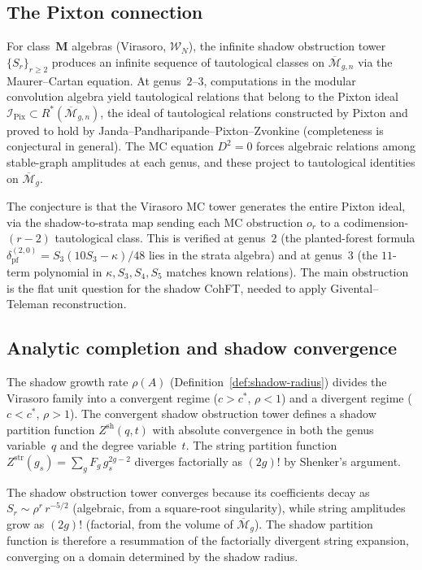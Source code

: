 \documentclass[11pt]{article}
\theoremstyle{plain}
\theoremstyle{definition}
\theoremstyle{remark}
\newcommand{\Mbar}{\overline{\mathcal{M}}}
\newcommand{\cW}{\mathcal{W}}
\begin{document}
\subsection*{The Pixton connection}

For class~$\mathbf{M}$ algebras (Virasoro, $\cW_N$), the
infinite shadow obstruction tower $\{S_r\}_{r \geq 2}$ produces an infinite
sequence of tautological classes on $\Mbar_{g,n}$ via the
Maurer--Cartan equation. At genus~$2$--$3$, computations in
the modular convolution algebra yield tautological relations
that belong to the Pixton ideal $\mathcal{I}_{\mathrm{Pix}}
\subset R^*(\Mbar_{g,n})$, the ideal of tautological
relations constructed by Pixton and proved to hold
by Janda--Pandharipande--Pixton--Zvonkine \cite{JPPZ}
(completeness is conjectural in general).
The MC equation $D^2 = 0$ forces algebraic relations
among stable-graph amplitudes at each genus, and these
project to tautological identities on $\Mbar_g$.

The conjecture is that the Virasoro MC tower generates the
entire Pixton ideal, via the shadow-to-strata map sending
each MC obstruction $o_r$ to a codimension-$(r-2)$
tautological class. This is verified at genus~$2$ (the
planted-forest formula
$\delta_{\mathrm{pf}}^{(2,0)} = S_3(10S_3 - \kappa)/48$
lies in the strata algebra) and at genus~$3$ (the
$11$-term polynomial in $\kappa, S_3, S_4, S_5$ matches
known relations). The main obstruction is the flat unit
question for the shadow CohFT, needed to apply
Givental--Teleman reconstruction.


\subsection*{Analytic completion and shadow convergence}

The shadow growth rate $\rho(A)$
(Definition~\ref{def:shadow-radius}) divides the Virasoro
family into a convergent regime ($c > c^*$, $\rho < 1$) and
a divergent regime ($c < c^*$, $\rho > 1$). The convergent
shadow obstruction tower defines a shadow partition function
$Z^{\mathrm{sh}}(q, t)$ with absolute convergence in both the
genus variable~$q$ and the degree variable~$t$. The
string partition function
$Z^{\mathrm{str}}(g_s) = \sum_g F_g\,g_s^{2g-2}$
diverges factorially as $(2g)!$ by Shenker's argument.

The shadow obstruction tower converges because its coefficients decay
as $S_r \sim \rho^r\,r^{-5/2}$ (algebraic, from a
square-root singularity), while string amplitudes grow as
$(2g)!$ (factorial, from the volume of $\Mbar_g$). The
shadow partition function is therefore a resummation of the
factorially divergent string expansion, converging on a
domain determined by the shadow radius.
\end{document}
